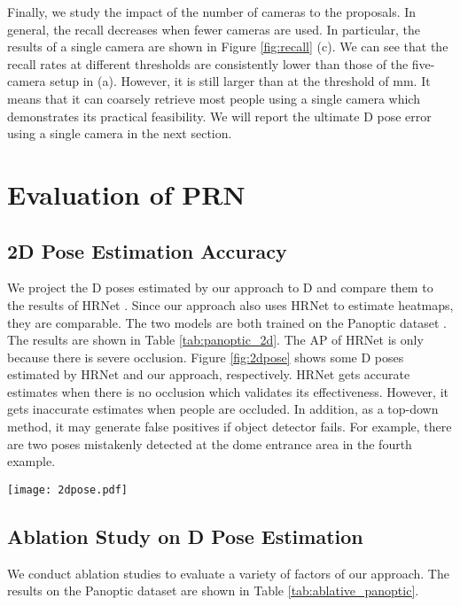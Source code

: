 \documentclass[runningheads]{llncs}
\begin{document}
Finally, we study the impact of the number of cameras to the proposals. In general, the recall decreases when fewer cameras are used. In particular, the results of a single camera are shown in Figure \ref{fig:recall} (c). We can see that the recall rates at different thresholds are consistently lower than those of the five-camera setup in (a). However, it is still larger than  at the threshold of mm. It means that it can coarsely retrieve most people using a single camera which demonstrates its practical feasibility. We will report the ultimate D pose error using a single camera in the next section.





\section{Evaluation of PRN}
\subsection{2D Pose Estimation Accuracy}
We project the D poses estimated by our approach to D and compare them to the results of HRNet \cite{sun2019deep}. Since our approach also uses HRNet to estimate heatmaps, they are comparable. The two models are both trained on the Panoptic dataset \cite{Joo_2017_TPAMI}. The results are shown in Table \ref{tab:panoptic_2d}. The AP of HRNet is only  because there is severe occlusion. 
Figure \ref{fig:2dpose} shows some D poses estimated by HRNet and our approach, respectively. HRNet gets accurate estimates when there is no occlusion which validates its effectiveness. However, it gets inaccurate estimates when people are occluded. In addition, as a top-down method, it may generate false positives if object detector fails. For example, there are two poses mistakenly detected at the dome entrance area in the fourth example.

\begin{figure*}
	\centering
	\texttt{[image: 2dpose.pdf]}
	\caption{Comparison of D poses estimated by HRNet \cite{sun2019deep} (top row) and our approach (bottom row). Ours are obtained by projecting the D poses to the images. Note that this is only proof-of-concept result rather than rigorous fair comparison as our approach uses multiview images as input. }
	\label{fig:2dpose}
\end{figure*}


\subsection{Ablation Study on D Pose Estimation}
We conduct ablation studies to evaluate a variety of factors of our approach. The results on the Panoptic dataset are shown in Table \ref{tab:ablative_panoptic}. 
\end{document}
